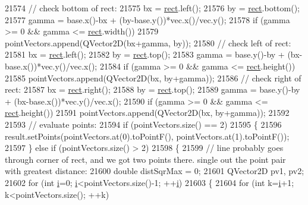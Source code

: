 \begin{DoxyCode}
21574     \textcolor{comment}{// check bottom of rect:}
21575     bx = \hyperlink{_gen_blob_8m_aea8f6815d9a63491fc422c5572c6b3c3}{rect}.left();
21576     by = \hyperlink{_gen_blob_8m_aea8f6815d9a63491fc422c5572c6b3c3}{rect}.bottom();
21577     gamma = base.x()-bx + (by-base.y())*vec.x()/vec.y();
21578     \textcolor{keywordflow}{if} (gamma >= 0 && gamma <= \hyperlink{_gen_blob_8m_aea8f6815d9a63491fc422c5572c6b3c3}{rect}.width())
21579       pointVectors.append(QVector2D(bx+gamma, by));
21580     \textcolor{comment}{// check left of rect:}
21581     bx = \hyperlink{_gen_blob_8m_aea8f6815d9a63491fc422c5572c6b3c3}{rect}.left();
21582     by = \hyperlink{_gen_blob_8m_aea8f6815d9a63491fc422c5572c6b3c3}{rect}.top();
21583     gamma = base.y()-by + (bx-base.x())*vec.y()/vec.x();
21584     \textcolor{keywordflow}{if} (gamma >= 0 && gamma <= \hyperlink{_gen_blob_8m_aea8f6815d9a63491fc422c5572c6b3c3}{rect}.height())
21585       pointVectors.append(QVector2D(bx, by+gamma));
21586     \textcolor{comment}{// check right of rect:}
21587     bx = \hyperlink{_gen_blob_8m_aea8f6815d9a63491fc422c5572c6b3c3}{rect}.right();
21588     by = \hyperlink{_gen_blob_8m_aea8f6815d9a63491fc422c5572c6b3c3}{rect}.top();
21589     gamma = base.y()-by + (bx-base.x())*vec.y()/vec.x();
21590     \textcolor{keywordflow}{if} (gamma >= 0 && gamma <= \hyperlink{_gen_blob_8m_aea8f6815d9a63491fc422c5572c6b3c3}{rect}.height())
21591       pointVectors.append(QVector2D(bx, by+gamma));
21592     
21593     \textcolor{comment}{// evaluate points:}
21594     \textcolor{keywordflow}{if} (pointVectors.size() == 2)
21595     \{
21596       result.setPoints(pointVectors.at(0).toPointF(), pointVectors.at(1).toPointF());
21597     \} \textcolor{keywordflow}{else} \textcolor{keywordflow}{if} (pointVectors.size() > 2)
21598     \{
21599       \textcolor{comment}{// line probably goes through corner of rect, and we got two points there. single out the point pair
       with greatest distance:}
21600       \textcolor{keywordtype}{double} distSqrMax = 0;
21601       QVector2D pv1, pv2;
21602       \textcolor{keywordflow}{for} (\textcolor{keywordtype}{int} \hyperlink{_comparision_pictures_2_createtest_image_8m_a6f6ccfcf58b31cb6412107d9d5281426}{i}=0; \hyperlink{_comparision_pictures_2_createtest_image_8m_a6f6ccfcf58b31cb6412107d9d5281426}{i}<pointVectors.size()-1; ++\hyperlink{_comparision_pictures_2_createtest_image_8m_a6f6ccfcf58b31cb6412107d9d5281426}{i})
21603       \{
21604         \textcolor{keywordflow}{for} (\textcolor{keywordtype}{int} k=\hyperlink{_comparision_pictures_2_createtest_image_8m_a6f6ccfcf58b31cb6412107d9d5281426}{i}+1; k<pointVectors.size(); ++k)

\end{DoxyCode}
